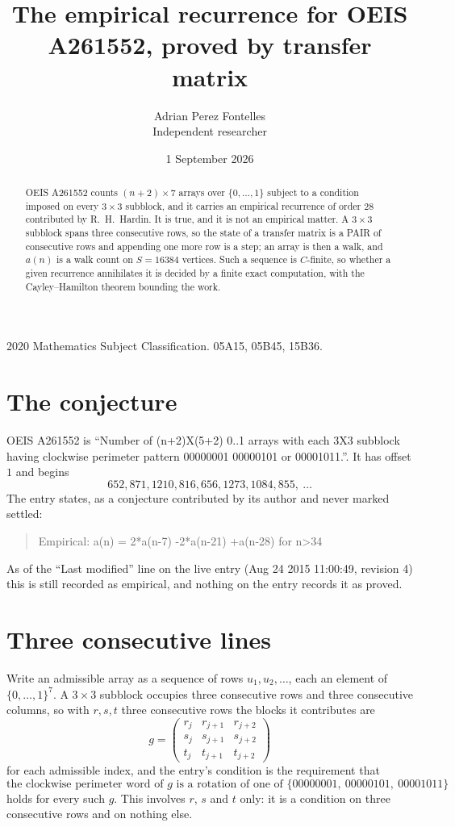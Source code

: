 \documentclass[11pt,a4paper]{article}
\title{The empirical recurrence for OEIS A261552, proved by transfer matrix}
\author{Adrian Perez Fontelles\\ \small Independent researcher}
\date{1 September 2026}
\theoremstyle{plain}
\theoremstyle{definition}
\begin{document}
\maketitle

\begin{abstract}
OEIS A261552 counts $(n+2)\times7$ arrays over $\{0,\dots,1\}$ subject to a condition imposed on
every $3\times3$ subblock, and it carries an empirical recurrence of order $28$
contributed by R.~H.~Hardin. It is true, and it is not an empirical matter. A $3\times3$
subblock spans three consecutive rows, so the state of a transfer matrix is a PAIR of
consecutive rows and appending one more row is a step; an array is then a walk, and
$a(n)$ is a walk count on $S=16384$ vertices. Such a sequence is $C$-finite, so whether a given
recurrence annihilates it is decided by a finite exact computation, with the Cayley--Hamilton
theorem bounding the work.
\end{abstract}

\noindent\small 2020 Mathematics Subject Classification. 05A15, 05B45, 15B36.\normalsize

\section{The conjecture}

OEIS A261552 is ``Number of (n+2)X(5+2) 0..1 arrays with each 3X3 subblock having clockwise perimeter pattern 00000001 00000101 or 00001011.''. It has offset $1$ and begins
\[
652, 871, 1210, 816, 656, 1273, 1084, 855,\ \dots
\]
The entry states, as a conjecture contributed by its author and never marked settled:
\begin{quote}
Empirical: a(n) = 2*a(n-7) -2*a(n-21) +a(n-28) for n>34
\end{quote}
As of the ``Last modified'' line on the live entry (Aug 24 2015 11:00:49, revision 4) this is still
recorded as empirical, and nothing on the entry records it as proved.

\section{Three consecutive lines}

Write an admissible array as a sequence of rows $u_1,u_2,\dots$, each an element of
$\{0,\dots,1\}^{7}$. A $3\times3$ subblock occupies three consecutive rows and
three consecutive columns, so with $r,s,t$ three consecutive rows the blocks it
contributes are
\[
g=\begin{pmatrix}r_j&r_{j+1}&r_{j+2}\\ s_j&s_{j+1}&s_{j+2}\\ t_j&t_{j+1}&t_{j+2}\end{pmatrix}
\]
for each admissible index, and the entry's condition is the requirement that
\[
\text{the clockwise perimeter word of }g\text{ is a rotation of one of }\{00000001,\ 00000101,\ 00001011\}
\]
holds for every such $g$. This involves $r$, $s$ and $t$ only: it is a condition on
three consecutive rows and on nothing else.
\end{document}
